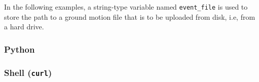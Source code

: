 In the following examples, a string-type variable named \texttt{event\_file}
is used to store the path to a ground motion file that is to be uploaded from disk, i.e, from a hard drive.

\subsubsection{Python}


\subsubsection{Shell (\texttt{curl})}

\begin{Shaded}
\begin{Highlighting}[]
\OperatorTok{=}
\OperatorTok{=}
\OperatorTok{=}
\OperatorTok{=}

   \DataTypeTok{\textbackslash{}}
   \NormalTok{:} \DataTypeTok{\textbackslash{}}
    \DataTypeTok{\textbackslash{}}

 
\end{Highlighting}
\end{Shaded}